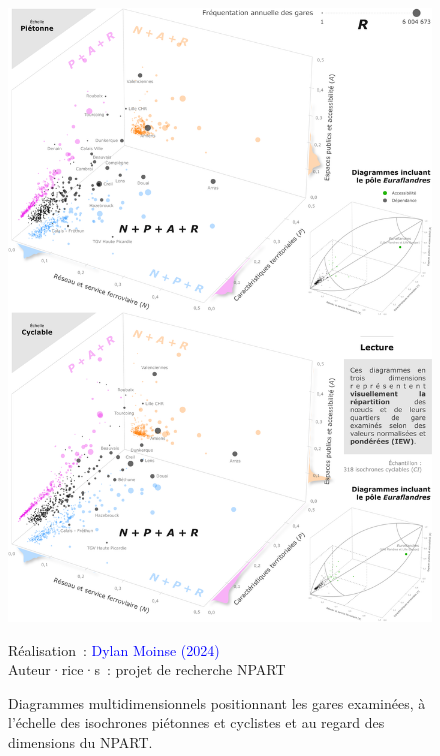 \begin{refsegment}
    \begin{figure}[h!]\vspace*{4pt}
        \caption{Diagrammes multidimensionnels positionnant les gares examinées, à l'échelle des isochrones piétonnes et cyclistes et au regard des dimensions du NPART.}
        \label{fig-chap6:diagramme-cubes}
        \centerline{\includegraphics[width=1\columnwidth]{src/Figures/Chap-6/FR_NPART_Cubes.pdf}}
        \vspace{5pt}
        \begin{flushright}\scriptsize{
        Réalisation~: \textcolor{blue}{Dylan Moinse (2024)}
        \\
        Auteur·rice·s~: projet de recherche \acrshort{NPART}
        }\end{flushright}
    \end{figure}


\end{refsegment}
